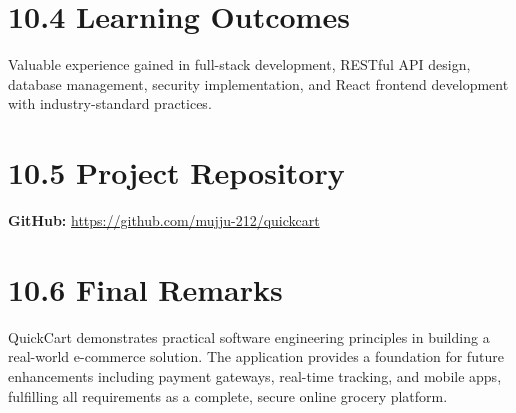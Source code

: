 \documentclass[12pt,a4paper]{report}
\begin{document}
\section*{10.4 Learning Outcomes}

Valuable experience gained in full-stack development, RESTful API design, database management, security implementation, and React frontend development with industry-standard practices.

\section*{10.5 Project Repository}

\textbf{GitHub:} \url{https://github.com/mujju-212/quickcart}

\section*{10.6 Final Remarks}

QuickCart demonstrates practical software engineering principles in building a real-world e-commerce solution. The application provides a foundation for future enhancements including payment gateways, real-time tracking, and mobile apps, fulfilling all requirements as a complete, secure online grocery platform.
\end{document}
